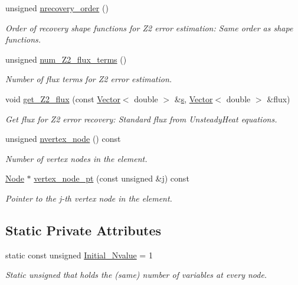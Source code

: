 \begin{DoxyCompactItemize}
unsigned \hyperlink{classoomph_1_1TUnsteadyHeatElement_a5216b9570896508b5fd6063ca46223a5}{nrecovery\+\_\+order} ()
\begin{DoxyCompactList}\small\item\em Order of recovery shape functions for Z2 error estimation\+: Same order as shape functions. \end{DoxyCompactList}\item 
unsigned \hyperlink{classoomph_1_1TUnsteadyHeatElement_a864e7ce7dae3e1db65650970d890273d}{num\+\_\+\+Z2\+\_\+flux\+\_\+terms} ()
\begin{DoxyCompactList}\small\item\em Number of \textquotesingle{}flux\textquotesingle{} terms for Z2 error estimation. \end{DoxyCompactList}\item 
void \hyperlink{classoomph_1_1TUnsteadyHeatElement_ac29f36351e80c4af68fe9e728872985d}{get\+\_\+\+Z2\+\_\+flux} (const \hyperlink{classoomph_1_1Vector}{Vector}$<$ double $>$ \&\hyperlink{cfortran_8h_ab7123126e4885ef647dd9c6e3807a21c}{s}, \hyperlink{classoomph_1_1Vector}{Vector}$<$ double $>$ \&flux)
\begin{DoxyCompactList}\small\item\em Get \textquotesingle{}flux\textquotesingle{} for Z2 error recovery\+: Standard flux from Unsteady\+Heat equations. \end{DoxyCompactList}\item 
unsigned \hyperlink{classoomph_1_1TUnsteadyHeatElement_a8fb6b9483f1e78e21144e1443a6f0f4d}{nvertex\+\_\+node} () const
\begin{DoxyCompactList}\small\item\em Number of vertex nodes in the element. \end{DoxyCompactList}\item 
\hyperlink{classoomph_1_1Node}{Node} $\ast$ \hyperlink{classoomph_1_1TUnsteadyHeatElement_aedf73b18995cae17e438ac72bb7ef959}{vertex\+\_\+node\+\_\+pt} (const unsigned \&j) const
\begin{DoxyCompactList}\small\item\em Pointer to the j-\/th vertex node in the element. \end{DoxyCompactList}\end{DoxyCompactItemize}
\subsection*{Static Private Attributes}
\begin{DoxyCompactItemize}
\item 
static const unsigned \hyperlink{classoomph_1_1TUnsteadyHeatElement_aba29bc3837ccd8a26538b4b6b0d87e53}{Initial\+\_\+\+Nvalue} = 1
\begin{DoxyCompactList}\small\item\em Static unsigned that holds the (same) number of variables at every node. \end{DoxyCompactList}\end{DoxyCompactItemize}
